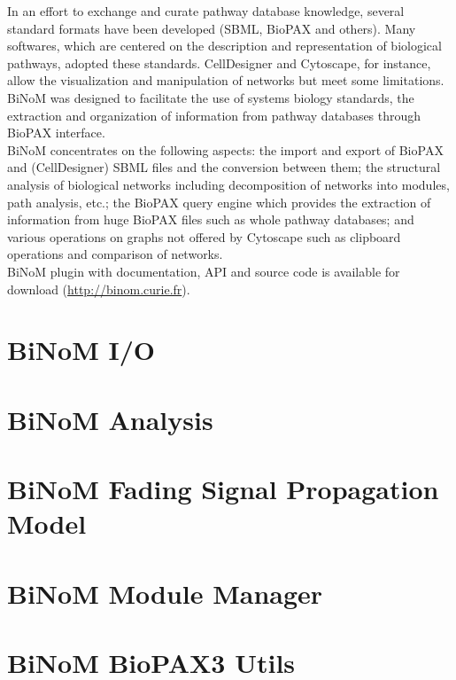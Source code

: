 \documentclass[11pt]{article}
\begin{document}
In an effort to exchange and curate pathway database knowledge, several standard
formats have been developed (SBML, BioPAX \cite{stromback2005representation} and
others). Many softwares, which are centered on the description and
representation of biological pathways, adopted these standards.
CellDesigner\cite{kitano2005using} and Cytoscape\cite{shannon2003cytoscape}, for
instance, allow the visualization and manipulation of networks but meet some
limitations. BiNoM was designed to facilitate the use of systems biology
standards, the extraction and organization of information from pathway databases
through BioPAX interface.\\

BiNoM concentrates on the following aspects: the import and export of BioPAX and
(CellDesigner) SBML files and the conversion between them; the structural
analysis of biological networks including decomposition of networks into
modules, path analysis, etc.; the BioPAX query engine which provides the
extraction of information from huge BioPAX files such as whole pathway
databases; and various operations on graphs not offered by Cytoscape such as
clipboard operations and comparison of networks.\\

BiNoM plugin with documentation, API and source code is available for download (\url{http://binom.curie.fr}).\\

\section{BiNoM I/O}

\clearpage

\section{BiNoM Analysis}

\clearpage

\section{BiNoM Fading Signal Propagation Model}

\clearpage

\section{BiNoM Module Manager}

\clearpage

\section{BiNoM BioPAX3 Utils}

\clearpage
\end{document}
